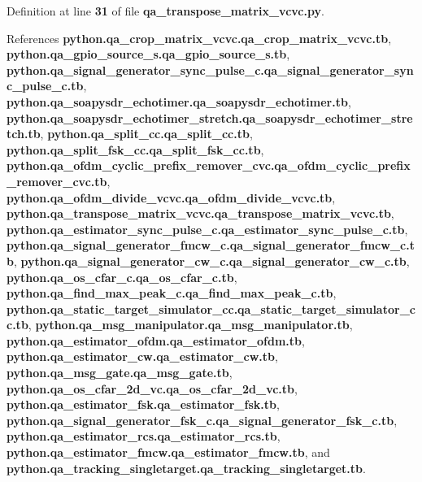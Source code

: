 Definition at line {\bf 31} of file {\bf qa\+\_\+transpose\+\_\+matrix\+\_\+vcvc.\+py}.



References {\bf python.\+qa\+\_\+crop\+\_\+matrix\+\_\+vcvc.\+qa\+\_\+crop\+\_\+matrix\+\_\+vcvc.\+tb}, {\bf python.\+qa\+\_\+gpio\+\_\+source\+\_\+s.\+qa\+\_\+gpio\+\_\+source\+\_\+s.\+tb}, {\bf python.\+qa\+\_\+signal\+\_\+generator\+\_\+sync\+\_\+pulse\+\_\+c.\+qa\+\_\+signal\+\_\+generator\+\_\+sync\+\_\+pulse\+\_\+c.\+tb}, {\bf python.\+qa\+\_\+soapysdr\+\_\+echotimer.\+qa\+\_\+soapysdr\+\_\+echotimer.\+tb}, {\bf python.\+qa\+\_\+soapysdr\+\_\+echotimer\+\_\+stretch.\+qa\+\_\+soapysdr\+\_\+echotimer\+\_\+stretch.\+tb}, {\bf python.\+qa\+\_\+split\+\_\+cc.\+qa\+\_\+split\+\_\+cc.\+tb}, {\bf python.\+qa\+\_\+split\+\_\+fsk\+\_\+cc.\+qa\+\_\+split\+\_\+fsk\+\_\+cc.\+tb}, {\bf python.\+qa\+\_\+ofdm\+\_\+cyclic\+\_\+prefix\+\_\+remover\+\_\+cvc.\+qa\+\_\+ofdm\+\_\+cyclic\+\_\+prefix\+\_\+remover\+\_\+cvc.\+tb}, {\bf python.\+qa\+\_\+ofdm\+\_\+divide\+\_\+vcvc.\+qa\+\_\+ofdm\+\_\+divide\+\_\+vcvc.\+tb}, {\bf python.\+qa\+\_\+transpose\+\_\+matrix\+\_\+vcvc.\+qa\+\_\+transpose\+\_\+matrix\+\_\+vcvc.\+tb}, {\bf python.\+qa\+\_\+estimator\+\_\+sync\+\_\+pulse\+\_\+c.\+qa\+\_\+estimator\+\_\+sync\+\_\+pulse\+\_\+c.\+tb}, {\bf python.\+qa\+\_\+signal\+\_\+generator\+\_\+fmcw\+\_\+c.\+qa\+\_\+signal\+\_\+generator\+\_\+fmcw\+\_\+c.\+tb}, {\bf python.\+qa\+\_\+signal\+\_\+generator\+\_\+cw\+\_\+c.\+qa\+\_\+signal\+\_\+generator\+\_\+cw\+\_\+c.\+tb}, {\bf python.\+qa\+\_\+os\+\_\+cfar\+\_\+c.\+qa\+\_\+os\+\_\+cfar\+\_\+c.\+tb}, {\bf python.\+qa\+\_\+find\+\_\+max\+\_\+peak\+\_\+c.\+qa\+\_\+find\+\_\+max\+\_\+peak\+\_\+c.\+tb}, {\bf python.\+qa\+\_\+static\+\_\+target\+\_\+simulator\+\_\+cc.\+qa\+\_\+static\+\_\+target\+\_\+simulator\+\_\+cc.\+tb}, {\bf python.\+qa\+\_\+msg\+\_\+manipulator.\+qa\+\_\+msg\+\_\+manipulator.\+tb}, {\bf python.\+qa\+\_\+estimator\+\_\+ofdm.\+qa\+\_\+estimator\+\_\+ofdm.\+tb}, {\bf python.\+qa\+\_\+estimator\+\_\+cw.\+qa\+\_\+estimator\+\_\+cw.\+tb}, {\bf python.\+qa\+\_\+msg\+\_\+gate.\+qa\+\_\+msg\+\_\+gate.\+tb}, {\bf python.\+qa\+\_\+os\+\_\+cfar\+\_\+2d\+\_\+vc.\+qa\+\_\+os\+\_\+cfar\+\_\+2d\+\_\+vc.\+tb}, {\bf python.\+qa\+\_\+estimator\+\_\+fsk.\+qa\+\_\+estimator\+\_\+fsk.\+tb}, {\bf python.\+qa\+\_\+signal\+\_\+generator\+\_\+fsk\+\_\+c.\+qa\+\_\+signal\+\_\+generator\+\_\+fsk\+\_\+c.\+tb}, {\bf python.\+qa\+\_\+estimator\+\_\+rcs.\+qa\+\_\+estimator\+\_\+rcs.\+tb}, {\bf python.\+qa\+\_\+estimator\+\_\+fmcw.\+qa\+\_\+estimator\+\_\+fmcw.\+tb}, and {\bf python.\+qa\+\_\+tracking\+\_\+singletarget.\+qa\+\_\+tracking\+\_\+singletarget.\+tb}.


